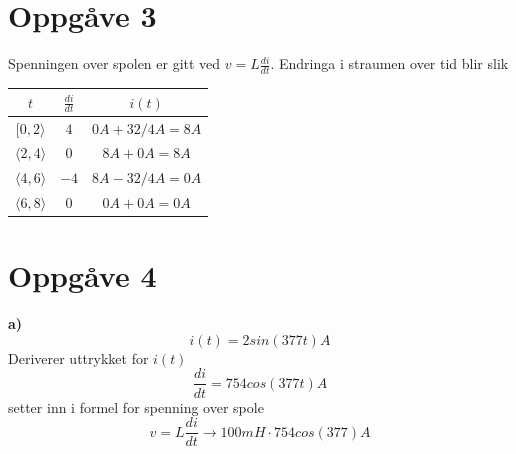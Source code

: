\documentclass[12pt,a4paper]{article}
\begin{document}
    

  \section{Oppgåve 3}
    Spenningen over spolen er gitt ved $v=L\frac{di}{dt}$. Endringa i straumen over
    tid blir slik
    \begin{center}
      \begin{tabular}{ |c|c|c| }
        \hline
        $t$ & $\frac{di}{dt}$ & $i(t)$ \\
        \hline
        $[0,2\rangle$ & $4$ & $0A + 32/4A = 8A$ \\
        \hline
        $\langle2,4\rangle$ & $0$ & $8A+0A = 8A$ \\
        \hline
        $\langle4,6\rangle$ & $-4$ & $8A-32/4A = 0A$ \\
        \hline
        $\langle6,8\rangle$ & $0$ & $0A + 0A = 0A$ \\
        \hline
      \end{tabular}
    \end{center}

    \begin{center}
    \end{center}

    \section{Oppgåve 4}
      \textbf{a)}
      \begin{equation}
        i(t) = 2sin(377t)A
      \end{equation}
      Deriverer uttrykket for $i(t)$
      \begin{equation}
        \frac{di}{dt} = 754cos(377t)A
      \end{equation}
      setter inn i formel for spenning over spole
      \begin{equation}
        v=L\frac{di}{dt} \rightarrow 100mH \cdot 754cos(377)A
      \end{equation}
\end{document}
